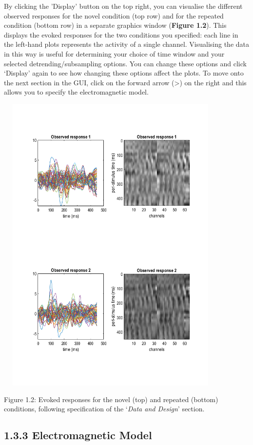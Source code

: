 By clicking the 'Display' button on the top right, you can visualise the
different observed responses for the novel condition (top row) and for
the repeated condition (bottom row) in a separate graphics window
(\textbf{Figure 1.2}). This displays the evoked responses for the two
conditions you specified: each line in the left-hand plots represents
the activity of a single channel. Visualising the data in this way is
useful for determining your choice of time window and your selected
detrending/subsampling options. You can change these options and click
`Display' again to see how changing these options affect the plots. To
move onto the next section in the GUI, click on the forward arrow
(\textgreater{}) on the right and this allows you to specify the
electromagnetic model.

\includegraphics[width=4.54639in,height=6.02062in]{evoked_responses.png}

Figure 1.2: Evoked responses for the novel (top) and repeated (bottom)
conditions, following specification of the `\emph{Data and Design}'
section.

\subsection{\texorpdfstring{\textbf{1.3.3 Electromagnetic
Model}}{1.3.3 Electromagnetic Model}}\label{electromagnetic-model}

